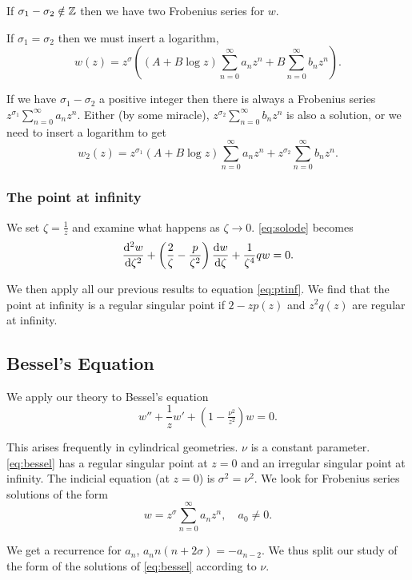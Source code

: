 \documentclass{notes}
\theoremstyle{plain}
\begin{document}
If $\sigma_1 - \sigma_2 \notin \mathbb{Z}$ then we have two Frobenius series
for $w$.

If $\sigma_1 = \sigma_2$ then we must insert a logarithm,
\[
w(z) = z^{\sigma} \left( \left( A + B \log z \right) \sum_{n=0}^\infty
a_n z^n + B \sum_{n=0}^\infty b_n z^n \right).
\]

If we have $\sigma_1 - \sigma_2$ a positive integer then there is
always a Frobenius series $z^{\sigma_1} \sum_{n=0}^\infty a_n z^n$.
Either (by some miracle), $z^{\sigma_2} \sum_{n=0}^\infty b_n z^n$ is
also a solution, or we need to insert a logarithm to get
\[
w_2(z) = z^{\sigma_1} \left(A + B \log z\right) \sum_{n=0}^\infty a_n z^n
+ z^{\sigma_2} \sum_{n=0}^\infty b_n z^n.
\]

\subsubsection*{The point at infinity}

We set $\zeta = \frac{1}{z}$ and examine what happens as $\zeta \to 0$.
\eqref{eq:solode} becomes
\begin{equation}\label{eq:ptinf}
\frac{\mathrm{d}^2w}{\mathrm{d}\zeta^2} + \left( \frac{2}{\zeta} - \frac{p}{\zeta^2} \right)
\frac{\mathrm{d} w}{\mathrm{d}\zeta} + \frac{1}{\zeta^4} q w = 0.
\end{equation}

We then apply all our previous results to equation \eqref{eq:ptinf}.  We
find that the point at infinity is a regular singular point if
$2 - z p(z)$ and $z^2 q(z)$ are regular at infinity.

\subsection{Bessel's Equation}

We apply our theory to Bessel's equation
\begin{equation}\label{eq:bessel}
w'' + \frac{1}{z} w' + \left( 1 - \tfrac{\nu^2}{z^2} \right)w = 0.
\end{equation}

This arises frequently in cylindrical geometries.  $\nu$ is a constant
parameter.  \eqref{eq:bessel} has a regular singular point at $z=0$
and an irregular singular point at infinity.  The indicial equation
(at $z=0$) is $\sigma^2 = \nu^2$.  We look for Frobenius series solutions
of the form
\[
w = z^\sigma \sum_{n=0}^\infty a_n z^n, \quad a_0 \neq 0.
\]

We get a recurrence for $a_n$, $a_n n (n+2 \sigma) = - a_{n-2}$.  We
thus split our study of the form of the solutions of \eqref{eq:bessel}
according to $\nu$.
\end{document}
